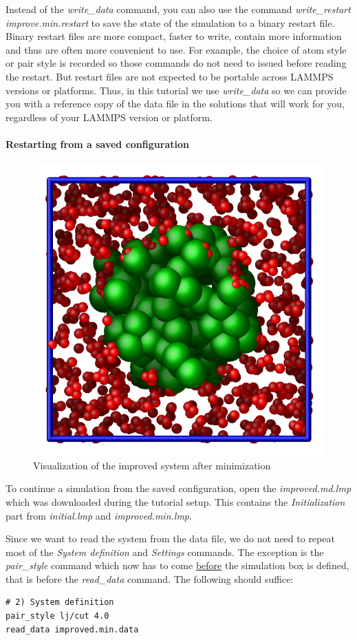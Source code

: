 \documentclass[9pt,tutorial]{livecoms}
\renewcommand{\emph}[1]{\underline{#1}}
\begin{document}
\begin{note}
  Instead of the \textit{write\_data} command, you can also use the
  command \textit{write\_restart improve.min.restart} to save the state
  of the simulation to a binary restart file.  Binary restart files are
  more compact, faster to write, contain more information and thus are
  often more convenient to use.  For example, the choice of atom style
  or pair style is recorded so those commands do not need to issued
  before reading the restart.  But restart files are not expected to be
  portable across LAMMPS versions or platforms.  Thus, in this tutorial
  we use \textit{write\_data} so we can provide you with a reference
  copy of the data file in the solutions that will work for you,
  regardless of your LAMMPS version or platform.
\end{note}

\paragraph{Restarting from a saved configuration}

\begin{figure}
\centering
\includegraphics[width=0.55\linewidth]{LJ-cylinder}
\caption{Visualization of the improved system after minimization}
\label{fig:improved-min}
\end{figure}

To continue a simulation from the saved configuration, open the
\textit{improved.md.lmp} which was downloaded during the tutorial setup.
This contains the \textit{Initialization} part from \textit{initial.lmp}
and \textit{improved.min.lmp}.

Since we want to read the system from the data file, we do not need
to repeat most of the \textit{System definition} and \textit{Settings}
commands.  The exception is the \textit{pair\_style} command which now
has to come \emph{before} the simulation box is defined, that is before
the \textit{read\_data} command.  The following should suffice:
\begin{lstlisting}
# 2) System definition
pair_style lj/cut 4.0
read_data improved.min.data
\end{lstlisting}
\end{document}
